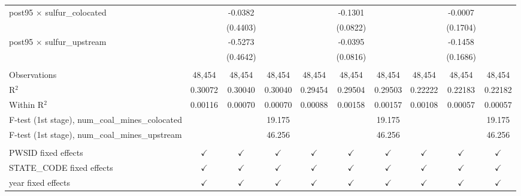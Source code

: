\begin{table}[htbp]
\begin{adjustbox}{width = \textwidth, center}
\begin{tabular}{lccccccccc}
         post95 $\times$ sulfur\_colocated                  &               & -0.0382       &               &                & -0.1301       &               &               & -0.0007       &   \\   
                                                            &               & (0.4403)      &               &                & (0.0822)      &               &               & (0.1704)      &   \\   
         post95 $\times$ sulfur\_upstream                   &               & -0.5273       &               &                & -0.0395       &               &               & -0.1458       &   \\   
                                                            &               & (0.4642)      &               &                & (0.0816)      &               &               & (0.1686)      &   \\   
          \\
         Observations                                       & 48,454        & 48,454        & 48,454        & 48,454         & 48,454        & 48,454        & 48,454        & 48,454        & 48,454\\  
         R$^2$                                              & 0.30072       & 0.30040       & 0.30040       & 0.29454        & 0.29504       & 0.29503       & 0.22222       & 0.22183       & 0.22182\\  
         Within R$^2$                                       & 0.00116       & 0.00070       & 0.00070       & 0.00088        & 0.00158       & 0.00157       & 0.00108       & 0.00057       & 0.00057\\  
         F-test (1st stage), num\_coal\_mines\_colocated    &               &               & 19.175        &                &               & 19.175        &               &               & 19.175\\  
         F-test (1st stage), num\_coal\_mines\_upstream     &               &               & 46.256        &                &               & 46.256        &               &               & 46.256\\  
          \\
         PWSID fixed effects                                & $\checkmark$  & $\checkmark$  & $\checkmark$  & $\checkmark$   & $\checkmark$  & $\checkmark$  & $\checkmark$  & $\checkmark$  & $\checkmark$\\   
         STATE\_CODE fixed effects                          & $\checkmark$  & $\checkmark$  & $\checkmark$  & $\checkmark$   & $\checkmark$  & $\checkmark$  & $\checkmark$  & $\checkmark$  & $\checkmark$\\   
         year fixed effects                                 & $\checkmark$  & $\checkmark$  & $\checkmark$  & $\checkmark$   & $\checkmark$  & $\checkmark$  & $\checkmark$  & $\checkmark$  & $\checkmark$\\   
         \bottomrule
      \end{tabular}
   \end{adjustbox}
\end{table}


